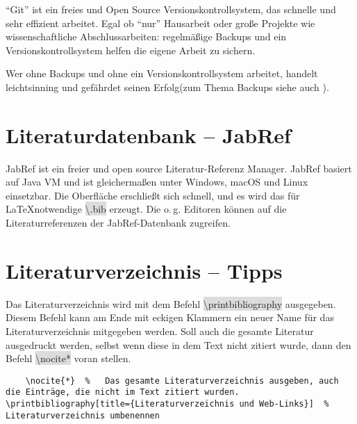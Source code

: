\documentclass[12pt,	%
				headings=small,		%
				toc=bibliography,	%
			]	%
{scrreprt}		%
\newcommand{\inlinecode}[1]{\colorbox{Gainsboro}{\textsf{\textbackslash#1}}} %
\begin{document}
\enquote{Git} ist ein freies und Open Source Versionskontrollsystem, das schnelle und sehr effizient arbeitet.\autocite{ProGit} Egal ob \enquote{nur} Hausarbeit oder große Projekte wie wissenschaftliche Abschlussarbeiten: regelmäßige Backups und ein Versionskontrollsystem helfen die eigene Arbeit zu sichern. 

Wer ohne Backups und ohne ein Versionskontrollsystem arbeitet, handelt leichtsinning und gefährdet seinen Erfolg(zum Thema Backups siehe auch \autocite{rmf:workflow}).


\section{Literaturdatenbank – JabRef}
\label{JabRef}
JabRef ist ein freier und  open source Literatur-Referenz Manager. JabRef basiert auf Java VM und ist gleichermaßen unter Windows, macOS und Linux einsetzbar. Die Oberfläche erschließt sich schnell, und es wird das für \LaTeX notwendige \inlinecode{*.bib} erzeugt. Die o.\,g. Editoren können auf die Literaturreferenzen der JabRef-Datenbank zugreifen.\autocite{JabRef}
\section{Literaturverzeichnis – Tipps}
Das Literaturverzeichnis wird mit dem Befehl \inlinecode{printbibliography} ausgegeben. Diesem Befehl kann am Ende mit eckigen Klammern ein neuer Name für das Literaturverzeichnis mitgegeben werden. Soll auch die gesamte Literatur ausgedruckt werden, selbst wenn diese in dem Text nicht zitiert wurde, dann den Befehl \inlinecode{nocite{*}} voran stellen.

\begin{lstlisting}
	\nocite{*}	%	Das gesamte Literaturverzeichnis ausgeben, auch die Einträge, die nicht im Text zitiert wurden.
\printbibliography[title={Literaturverzeichnis und Web-Links}]	% Literaturverzeichnis umbenennen
\end{lstlisting}

\label{sec:LiteraturverzeichnisTipps}




\nocite{*}	%

\printbibliography[title={Literaturverzeichnis und Web-Links}]	%
	
\end{document}
